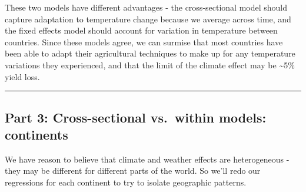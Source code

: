 \documentclass[
]{article}
\begin{document}
These two models have different advantages - the cross-sectional model
should capture adaptation to temperature change because we average
across time, and the fixed effects model should account for variation in
temperature between countries. Since these models agree, we can surmise
that most countries have been able to adapt their agricultural
techniques to make up for any temperature variations they experienced,
and that the limit of the climate effect may be \textasciitilde5\% yield
loss.

\begin{center}\rule{0.5\linewidth}{0.5pt}\end{center}

\hypertarget{part-3-cross-sectional-vs.-within-models-continents}{%
\subsection{Part 3: Cross-sectional vs.~within models:
continents}\label{part-3-cross-sectional-vs.-within-models-continents}}

We have reason to believe that climate and weather effects are
heterogeneous - they may be different for different parts of the world.
So we'll redo our regressions for each continent to try to isolate
geographic patterns.
\end{document}
